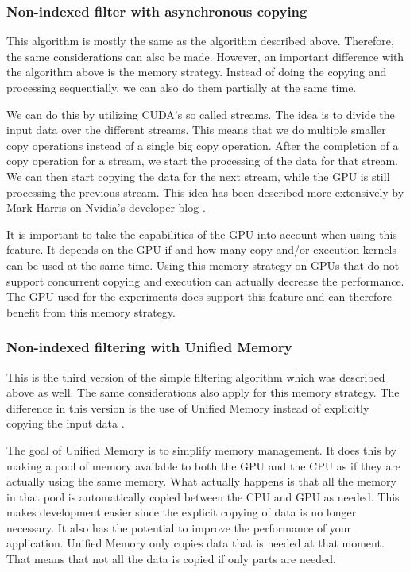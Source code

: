 \documentclass[a4paper,titlepage]{article}
\begin{document}
\subsubsection{Non-indexed filter with asynchronous copying}
\label{sec:filter-asynchronous}
This algorithm is mostly the same as the algorithm described above. Therefore, the same considerations can also be made. However, an important difference with the algorithm above is the memory strategy. Instead of doing the copying and processing sequentially, we can also do them partially at the same time.

We can do this by utilizing CUDA's so called streams. The idea is to divide the input data over the different streams. This means that we do multiple smaller copy operations instead of a single big copy operation. After the completion of a copy operation for a stream, we start the processing of the data for that stream. We can then start copying the data for the next stream, while the GPU is still processing the previous stream. This idea has been described more extensively by Mark Harris on Nvidia's developer blog \cite{cuda-overlap-streams}.

It is important to take the capabilities of the GPU into account when using this feature. It depends on the GPU if and how many copy and/or execution kernels can be used at the same time. Using this memory strategy on GPUs that do not support concurrent copying and execution can actually decrease the performance. The GPU used for the experiments does support this feature and can therefore benefit from this memory strategy.

\subsubsection{Non-indexed filtering with Unified Memory}
\label{sec:filter-unified-memory}
This is the third version of the simple filtering algorithm which was described above as well. The same considerations also apply for this memory strategy. The difference in this version is the use of Unified Memory instead of explicitly copying the input data \cite{harris2013}.

The goal of Unified Memory is to simplify memory management. It does this by making a pool of memory available to both the GPU and the CPU as if they are actually using the same memory. What actually happens is that all the memory in that pool is automatically copied between the CPU and GPU as needed. This makes development easier since the explicit copying of data is no longer necessary. It also has the potential to improve the performance of your application. Unified Memory only copies data that is needed at that moment. That means that not all the data is copied if only parts are needed.
\end{document}
